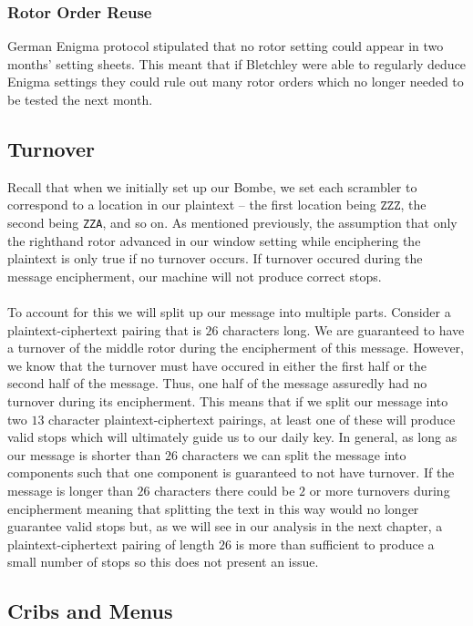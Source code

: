 \subsubsection{Rotor Order Reuse}
German Enigma protocol stipulated that no rotor setting could appear
in two months' setting sheets. This meant that if Bletchley were able
to regularly deduce Enigma settings they could rule out many rotor
orders which no longer needed to be tested the next month.

\subsection{Turnover}
Recall that when we initially set up our Bombe, we set each scrambler
to correspond to a location in our plaintext -- the first location
being $\texttt{ZZZ}$, the second being \texttt{ZZA}, and so on. As
mentioned previously, the assumption that only the righthand rotor
advanced in our window setting while enciphering the plaintext is
only true if no turnover occurs. If turnover occured during the
message encipherment, our machine will not produce correct stops.
\\\\To account for this we will split up our message into multiple
parts. Consider a plaintext-ciphertext pairing that is $26$
characters long. We are guaranteed to have a turnover of the middle
rotor during the encipherment of this message. However, we know that
the turnover must have occured in either the first half or the second
half of the message. Thus, one half of the message assuredly had no
turnover during its encipherment. This means that if we split our
message into two $13$ character plaintext-ciphertext pairings, at
least one of these will produce valid stops which will ultimately
guide us to our daily key. In general, as long as our message is
shorter than $26$ characters we can split the message into components
such that one component is guaranteed to not have turnover. If the
message is longer than $26$ characters there could be $2$ or more
turnovers during encipherment meaning that splitting the text in this
way would no longer guarantee valid stops but, as we will see in our
analysis in the next chapter, a plaintext-ciphertext pairing of
length $26$ is more than sufficient to produce a small number of
stops so this does not present an issue.
\subsection{Cribs and Menus}

